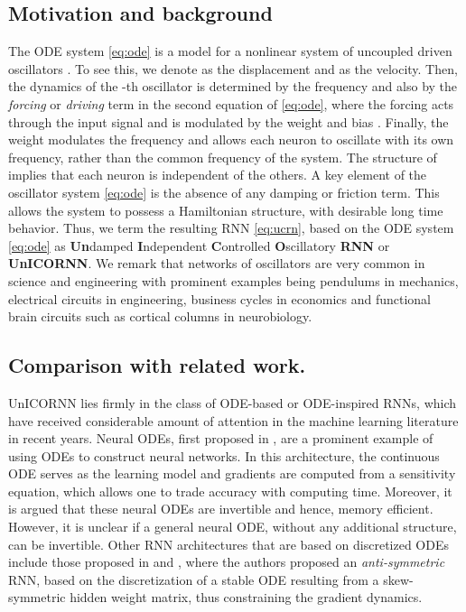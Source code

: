 \documentclass{article}
\begin{document}
\subsection{Motivation and background}
The ODE system \eqref{eq:ode} is a model for a nonlinear system of uncoupled driven oscillators \cite{GHbook}. To see this, we denote  as the displacement and  as the velocity. Then, the dynamics of the -th oscillator is determined by the frequency  and also by the \emph{forcing} or \emph{driving} term in the second equation of \eqref{eq:ode}, where the forcing acts through the input signal  and is modulated by the weight  and bias . Finally, the weight  modulates the frequency  and allows each neuron to oscillate with its own frequency, rather than the common frequency  of the system. The structure of  implies that each neuron is independent of the others. A key element of the oscillator system \eqref{eq:ode} is the absence of any damping or friction term. This allows the system to possess a Hamiltonian structure, with desirable long time behavior. Thus, we term the resulting RNN \eqref{eq:ucrn}, based on the ODE system \eqref{eq:ode} as \textbf{Un}damped \textbf{I}ndependent \textbf{C}ontrolled \textbf{O}scillatory \textbf{RNN} or \textbf{UnICORNN}. We remark that networks of oscillators are very common in science and engineering \cite{GHbook,stgz2} with prominent examples being pendulums in mechanics, electrical circuits in engineering, business cycles in economics and functional brain circuits such as cortical columns in neurobiology. 
\subsection{Comparison with related work.}
UnICORNN lies firmly in the class of ODE-based or ODE-inspired RNNs, which have received considerable amount of attention in the machine learning literature in recent years. Neural ODEs, first proposed in \cite{neuralODE}, are a prominent example of using ODEs to construct neural networks. In this architecture, the continuous ODE serves as the learning model and gradients are computed from a sensitivity equation, which allows one to trade accuracy with computing time. Moreover, it is argued that these neural ODEs are invertible and hence, memory efficient. However, it is unclear if a general neural ODE, without any additional structure, can be invertible. Other RNN architectures that are based on discretized ODEs include those proposed in \cite{E} and \cite{anti}, where the authors proposed an \emph{anti-symmetric} RNN, based on the discretization of a stable ODE resulting from a skew-symmetric hidden weight matrix, thus constraining the gradient dynamics.
\end{document}
